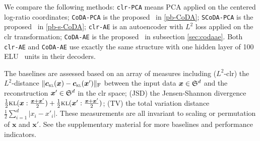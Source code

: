 \documentclass{article}
\begin{document}
We compare the following methods:
\texttt{clr-PCA} means PCA applied on the centered log-ratio coordinates;
\texttt{CoDA-PCA} is the proposed \CoDAPCA~in \eqref{pb-CoDA};
\texttt{SCoDA-PCA} is the proposed \surrogateCoDAPCA~in \eqref{pb-s-CoDA};
\texttt{clr-AE} is an autoencoder with $L^2$ loss applied on the clr transformation;
\texttt{CoDA-AE} is the proposed \CoDAAE~in subsection \ref{sec:codaae}.
Both \texttt{clr-AE} and \texttt{CoDA-AE} use
exactly the same structure with one hidden layer of 100 ELU~\cite{cuhFA} units
in their decoders.

The baselines are assessed based on an array of measures including
($L^2$-clr) the $L^2$-distance
$\Vert\clrlog(\bm{x})-\clrlog(\bm{x}')\Vert_{\mathrm{F}}$
between the input data $\bm{x}\in\mathfrak{S}^d$ and the reconstruction $\bm{x}'\in\mathfrak{S}^d$ in the clr space;
(JSD) %
the Jensen-Shannon divergence
$\frac{1}{2}{\textsc{kl}}(\bm{x}:\frac{\bm{x}+\bm{x}'}{2})+\frac{1}{2}{\textsc{kl}}(\bm{x}':\frac{\bm{x}+\bm{x}'}{2})$;
(TV) the total variation distance $\frac{1}{2}\sum_{i=1}^d\vert{x}_i-{x}'_i\vert$.
These measurements are all invariant to scaling or permutation of $\bm{x}$ and $\bm{x}'$.
See the supplementary material for more baselines and performance indicators.

\end{document}
